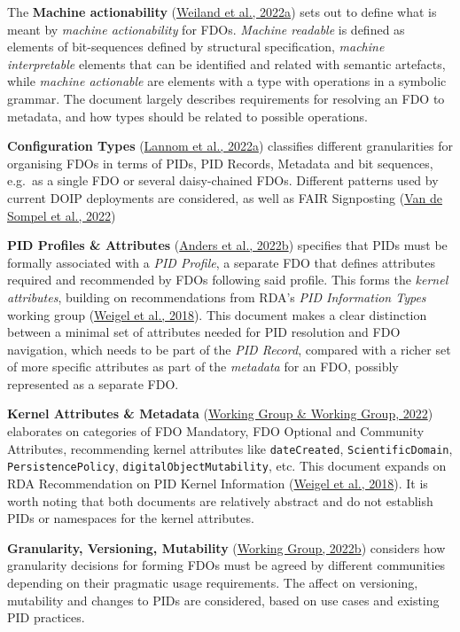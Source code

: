 The \textbf{Machine actionability} (\protect\hyperlink{ref-iJeys0T5}{Weiland et al., 2022a}) sets out to define what is meant by \emph{machine actionability} for FDOs. \emph{Machine readable} is defined as elements of bit-sequences defined by structural specification, \emph{machine interpretable} elements that can be identified and related with semantic artefacts, while \emph{machine actionable} are elements with a type with operations in a symbolic grammar. The document largely describes requirements for resolving an FDO to metadata, and how types should be related to possible operations.

\textbf{Configuration Types} (\protect\hyperlink{ref-SPd0uEqO}{Lannom et al., 2022a}) classifies different granularities for organising FDOs in terms of PIDs, PID Records, Metadata and bit sequences, e.g.~as a single FDO or several daisy-chained FDOs. Different patterns used by current DOIP deployments are considered, as well as FAIR Signposting (\protect\hyperlink{ref-snykkm7R}{Van de Sompel et al., 2022})

\textbf{PID Profiles \& Attributes} (\protect\hyperlink{ref-ljVViWCl}{Anders et al., 2022b}) specifies that PIDs must be formally associated with a \emph{PID Profile}, a separate FDO that defines attributes required and recommended by FDOs following said profile. This forms the \emph{kernel attributes}, building on recommendations from RDA's \emph{PID Information Types} working group (\protect\hyperlink{ref-lCoshHXg}{Weigel et al., 2018}). This document makes a clear distinction between a minimal set of attributes needed for PID resolution and FDO navigation, which needs to be part of the \emph{PID Record}, compared with a richer set of more specific attributes as part of the \emph{metadata} for an FDO, possibly represented as a separate FDO.

\textbf{Kernel Attributes \& Metadata} (\protect\hyperlink{ref-Fi62cJAo}{Working Group \& Working Group, 2022}) elaborates on categories of FDO Mandatory, FDO Optional and Community Attributes, recommending kernel attributes like \texttt{dateCreated}, \texttt{ScientificDomain}, \texttt{PersistencePolicy}, \texttt{digitalObjectMutability}, etc. This document expands on RDA Recommendation on PID Kernel Information (\protect\hyperlink{ref-lCoshHXg}{Weigel et al., 2018}). It is worth noting that both documents are relatively abstract and do not establish PIDs or namespaces for the kernel attributes.

\textbf{Granularity, Versioning, Mutability} (\protect\hyperlink{ref-16W9AycSW}{Working Group, 2022b}) considers how granularity decisions for forming FDOs must be agreed by different communities depending on their pragmatic usage requirements. The affect on versioning, mutability and changes to PIDs are considered, based on use cases and existing PID practices.

